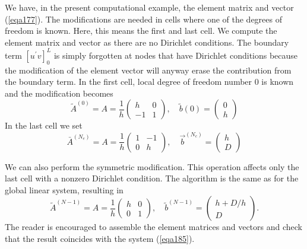 \documentclass[../main.tex]{subfiles}
\begin{document}
		We have, in the present computational example, the element matrix and vector (\ref{eqa177}). The modifications are needed in cells where one of the degrees of freedom is known. Here, this means the first and last cell. We compute the element matrix and vector as there are no Dirichlet conditions. The boundary term $\left[u^{\prime} v\right]_{0}^{L}$ is simply forgotten at nodes that have Dirichlet conditions because the modification of the element vector will anyway erase the contribution from the boundary term. In the first cell, local degree of freedom number 0 is known and the modification becomes
		\begin{equation}
			\label{eqa186}	
			\tilde{A}^{(0)}=A=\frac{1}{h}\left(\begin{array}{rr}
				h & 0 \\
				-1 & 1
			\end{array}\right), \quad \tilde{b}(0)=\left(\begin{array}{l}
				0 \\
				h
			\end{array}\right)
		\end{equation}
		In the last cell we set
		\begin{equation}
			\label{eqa187}
			\bar{A}^{\left(N_{e}\right)}=A=\frac{1}{h}\left(\begin{array}{rr}
				1 & -1 \\
				0 & h
			\end{array}\right), \quad \vec{b}^{\left(N_{c}\right)}=\left(\begin{array}{l}
				h \\
				D
			\end{array}\right)
		\end{equation}
	
		We can also perform the symmetric modification. This operation affects only the last cell with a nonzero Dirichlet condition. The algorithm is the same as for the global linear system, resulting in
		\begin{equation}
			\label{eqa188}
			\tilde{A}^{(N-1)}=A=\frac{1}{h}\left(\begin{array}{cc}
				h & 0 \\
				0 & 1
			\end{array}\right), \quad \tilde{b}^{(N-1)}=\left(\begin{array}{c}
				h+D / h \\
				D
			\end{array}\right) .
		\end{equation}
		The reader is encouraged to assemble the element matrices and vectors and check that the result coincides with the system (\ref{eqa185}).
\clearpage
\end{document}
